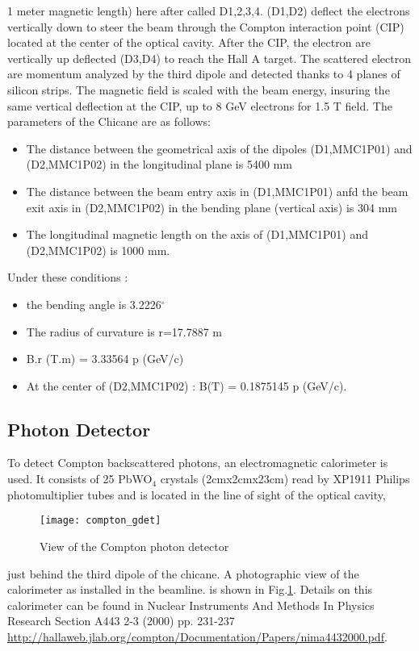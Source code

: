 {{1 meter magnetic length) here after called D1,2,3,4.
(D1,D2) deflect  the electrons  vertically down to steer
the beam through the Compton interaction point (CIP) located at the center of
the optical cavity. After the CIP, the electron are vertically up deflected (D3,D4) to reach
the Hall A target. The scattered electron are momentum analyzed by the third dipole and
detected thanks to 4 planes of silicon strips.
The magnetic field is scaled with the beam energy, insuring the same vertical deflection at the CIP,
up to 8 GeV electrons for 1.5 T field. The parameters of the Chicane are as follows:
\begin{itemize}
\item The distance between the geometrical axis of the
        dipoles (D1,MMC1P01) and (D2,MMC1P02) in the longitudinal plane is 5400 mm
	\item The distance between the beam entry axis in (D1,MMC1P01) anfd the
        beam exit axis in (D2,MMC1P02) in the bending plane (vertical axis) is 304 mm
	\item The longitudinal magnetic length on the axis of (D1,MMC1P01) and
	(D2,MMC1P02) is 1000 mm.
\end{itemize}

\par Under these conditions :
\begin{itemize}
    \item the bending angle is 3.2226$^{\circ}$
    \item The radius of curvature is r=17.7887 m
    \item B.r (T.m) = 3.33564 p (GeV/c)
    \item At the center of (D2,MMC1P02) : B(T) = 0.1875145 p (GeV/c).
\end{itemize}

\subsection{Photon Detector}
To detect Compton backscattered photons, an electromagnetic
calorimeter is used. It consists of 25 PbWO$_4$ crystals (2cmx2cmx23cm) read by XP1911
Philips photomultiplier tubes and is located in the line of sight of the optical cavity,
\label{sec:compton_gdet}
\begin{figure}[htp]
    \begin{center}
        \texttt{[image: compton\_gdet]}
    \end{center}
    \caption[compton:photon detector]{
            View of the Compton photon detector
            }
    \label{fig:compton_gdet}
 \end{figure}
just behind the third  dipole of the chicane.
 A photographic view of the calorimeter as installed in the beamline.
 is shown in Fig.\ref{fig:compton_gdet}. 
Details on this calorimeter can be found
in  Nuclear Instruments And Methods In Physics Research Section A443 2-3 (2000) pp. 231-237
\url{http://hallaweb.jlab.org/compton/Documentation/Papers/nima4432000.pdf}.

}}
